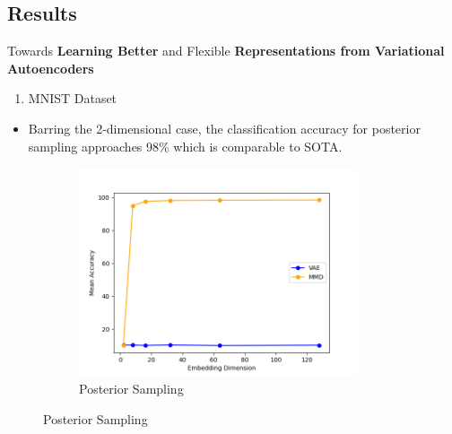 \documentclass[hyperref={colorlinks,citecolor=blue,linkcolor=blue,urlcolor=blue}]{beamer}
\begin{document}
\subsection{Results}

\begin{frame}{ Towards \textbf{Learning Better} and Flexible \textbf{Representations from Variational Autoencoders} \vspace{0.3em}}
  \begin{enumerate}
    \item MNIST Dataset
  \end{enumerate}
  \begin{itemize}
    \item Barring the 2-dimensional case, the classification accuracy for posterior sampling approaches 98\% which is comparable to SOTA.
  \end{itemize}
  \begin{figure}
    \begin{subfigure}[b]{0.45\textwidth}
        \centering
        \includegraphics[width=0.9\textwidth,]{./Images/MNIST_Compare_Sampling.png}
        \caption{Posterior Sampling}
    \end{subfigure}
  \end{figure}
\end{frame}
\end{document}
